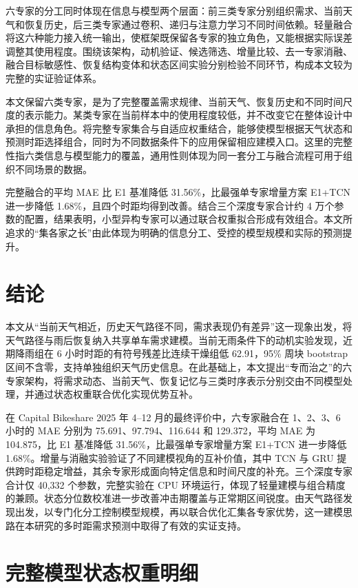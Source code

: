 \documentclass[UTF8,11pt,a4paper]{ctexart}
\begin{document}
六专家的分工同时体现在信息与模型两个层面：前三类专家分别组织需求、当前天气和恢复历史，后三类专家通过卷积、递归与注意力学习不同时间依赖。轻量融合将这六种能力接入统一输出，使框架既保留各专家的独立角色，又能根据实际误差调整其使用程度。围绕该架构，动机验证、候选筛选、增量比较、去一专家消融、融合目标敏感性、恢复结构变体和状态区间实验分别检验不同环节，构成本文较为完整的实证验证体系。

本文保留六类专家，是为了完整覆盖需求规律、当前天气、恢复历史和不同时间尺度的表示能力。某类专家在当前样本中的使用程度较低，并不改变它在整体设计中承担的信息角色。将完整专家集合与自适应权重结合，能够使模型根据天气状态和预测时距选择组合，同时为不同数据条件下的应用保留相应建模入口。这里的完整性指六类信息与模型能力的覆盖，通用性则体现为同一套分工与融合流程可用于组织不同场景的数据。

完整融合的平均 MAE 比 E1 基准降低 31.56\%，比最强单专家增量方案 E1+TCN 进一步降低 1.68\%，且四个时距均得到改善。结合三个深度专家合计约 4 万个参数的配置，结果表明，小型异构专家可以通过联合权重拟合形成有效组合。本文所追求的“集各家之长”由此体现为明确的信息分工、受控的模型规模和实际的预测提升。

\section{结论}

本文从“当前天气相近，历史天气路径不同，需求表现仍有差异”这一现象出发，将天气路径与雨后恢复纳入共享单车需求建模。当前无雨条件下的动机实验发现，近期降雨组在 6 小时时距的有符号残差比连续干燥组低 62.91，95\% 周块 bootstrap 区间不含零，支持单独组织天气历史信息。在此基础上，本文提出“专而治之”的六专家架构，将需求动态、当前天气、恢复记忆与三类时序表示分别交由不同模型处理，并通过状态权重联合优化实现优势互补。

在 Capital Bikeshare 2025 年 4--12 月的最终评价中，六专家融合在 1、2、3、6 小时的 MAE 分别为 75.691、97.794、116.644 和 129.372，平均 MAE 为 104.875，比 E1 基准降低 31.56\%，比最强单专家增量方案 E1+TCN 进一步降低 1.68\%。增量与消融实验验证了不同建模视角的互补价值，其中 TCN 与 GRU 提供跨时距稳定增益，其余专家形成面向特定信息和时间尺度的补充。三个深度专家合计仅 40,332 个参数，完整实验在 CPU 环境运行，体现了轻量建模与组合精度的兼顾。状态分位数校准进一步改善冲击期覆盖与正常期区间锐度。由天气路径发现出发，以专门化分工控制模型规模，再以联合优化汇集各专家优势，这一建模思路在本研究的多时距需求预测中取得了有效的实证支持。

\appendix
\section{完整模型状态权重明细}
\end{document}
